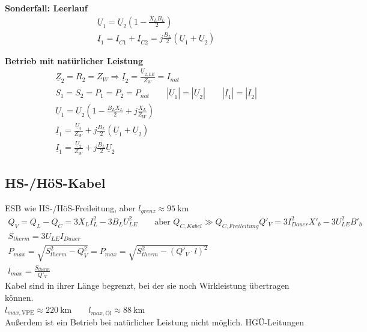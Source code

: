     \textbf{Sonderfall: Leerlauf}
    \begin{gather*}
        \underline{U}_1 = \underline{U}_2 \left( 1 - \frac{X_L B_L}{2} \right) \\
        \underline{I}_1 = \underline{I}_{C1} + \underline{I}_{C2} = j \frac{B_L}{2} (\underline{U}_1 + \underline{U}_2) 
    \end{gather*}

    \textbf{Betrieb mit natürlicher Leistung}
    \begin{gather*}
        \underline{Z}_2 = R_2 = Z_W \Rightarrow \underline{I}_2 = \frac{\underline{U}_{2,LE}}{Z_W} = I_{nat} \\
        S_1 = S_2 = P_1 = P_2 = P_{nat} \qquad |\underline{U}_1| = |\underline{U}_2| \qquad |\underline{I}_1| = |\underline{I}_2| \\
        \underline{U}_1 = \underline{U}_2 \left(1 - \frac{B_L X_L}{2} + j \frac{X_L}{Z_W}\right) \\
        \underline{I}_1 = \frac{\underline{U}_2}{Z_W} + j \frac{B_L}{2} \left(\underline{U}_1 + \underline{U}_2\right) \\
        \underline{I}_1 = \frac{\underline{U}_2}{Z_W} + j \frac{B_L}{2} \underline{U}_2
    \end{gather*}

\subsection{HS-/HöS-Kabel}
    ESB wie HS-/HöS-Freileitung, aber \(l_{grenz} \approx \SI{95}{\kilo\meter}\)
    \begin{gather*}
        Q_V = Q_L - Q_C = 3 X_L I_L^2 - 3 B_L U_{LE}^2 \qquad \text{aber } Q_{C,Kabel} \gg Q_{C,Freileitung}
        Q'_V = 3 I_{Dauer}^2 X'_b - 3 U_{LE}^2 B'_b \\
        S_{therm} = 3 U_{LE} I_{Dauer} \\
        P_{max} = \sqrt{S_{therm}^2 - Q_V^2} = P_{max} = \sqrt{S_{therm}^2 - (Q'_V \cdot l)^2} \\
        l_{max} = \frac{S_{therm}}{Q'_V}
    \end{gather*}
    Kabel sind in ihrer Länge begrenzt, bei der sie noch Wirkleistung übertragen können. \\
    \(l_{max,\text{VPE}} \approx \SI{220}{\kilo\meter} \qquad l_{max,\text{Öl}} \approx \SI{88}{\kilo\meter}\) \\
    Außerdem ist ein Betrieb bei natürlicher Leistung nicht möglich. \textrightarrow HGÜ-Leitungen